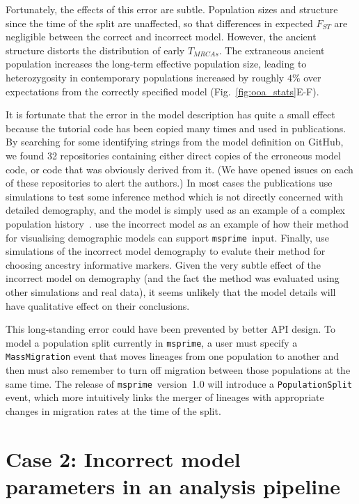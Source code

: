 \documentclass{article}
\newcommand{\msprime}[0]{\texttt{msprime}}
\begin{document}
Fortunately, the effects of this error are subtle.
Population sizes and structure since the time of
the split are unaffected, so that differences in expected $F_{ST}$ are negligible between
the correct and incorrect model. However, the ancient structure distorts the distribution
of early $T_{MRCAs}$. The extraneous ancient population increases the long-term effective 
population size, leading to heterozygosity in contemporary populations
increased by roughly $4\%$ over expectations from the correctly specified 
model (Fig.~\ref{fig:ooa_stats}E-F).

It is fortunate that the error in the model description has quite a
small effect because the tutorial code has been copied many times
and used in publications. By searching for some identifying strings
from the model definition on GitHub,
we found 32 repositories containing either direct copies of the
erroneous model code, or code that was obviously derived from it.
(We have opened issues on each of these repositories to alert the authors.)
In most cases the publications use simulations to test some inference
method which is not directly concerned with detailed demography,
and the model is simply used as an example of a complex population
history~\citep{kelleher2019inferring,albers2020dating,tong2020population}.
\cite{zhou2018popdemog} use the incorrect model as an example
of how their method for visualising demographic models can support
\msprime\ input.
Finally, \cite{pfaffelhuber2020choose}
use simulations of the incorrect model demography to evalute
their method for choosing ancestry informative markers.
Given the very subtle effect of the incorrect
model on demography (and the fact the method was evaluated using other
simulations and real data), it seems unlikely that the model details
will have qualitative effect on their conclusions.

This long-standing error could have been prevented by better API design.
To model a population split currently in \msprime, a user must specify a
\texttt{MassMigration} event that moves lineages from one population to another
and then must also remember to turn off migration
between those populations at the same time.
The release of \msprime\ version~1.0 will introduce a \texttt{PopulationSplit} event,
which more intuitively links the merger of lineages with appropriate changes in
migration rates at the time of the split.

\section*{Case 2: Incorrect model parameters in an analysis pipeline}
\end{document}
